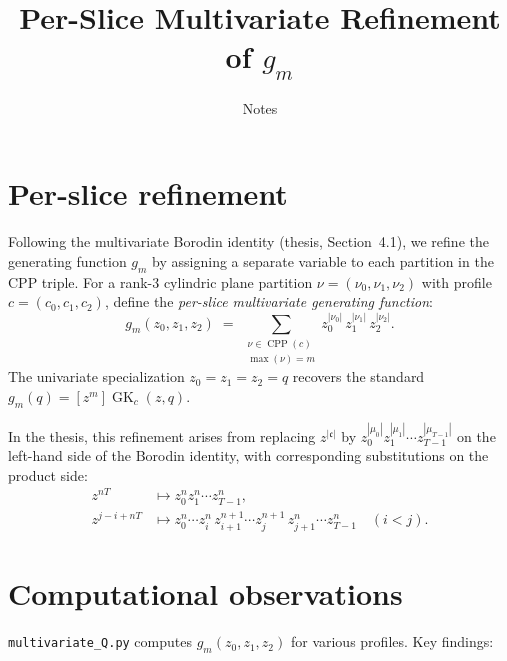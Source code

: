 \documentclass[11pt]{article}
\title{Per-Slice Multivariate Refinement of $g_m$}
\author{Notes}
\date{}
\newcommand{\CPP}{\operatorname{CPP}}
\newcommand{\GK}{\operatorname{GK}}
\begin{document}
\maketitle

\section{Per-slice refinement}

Following the multivariate Borodin identity (thesis, Section~4.1),
we refine the generating function $g_m$ by assigning a separate variable
to each partition in the CPP triple.  For a rank-3 cylindric plane
partition $\nu = (\nu_0, \nu_1, \nu_2)$ with profile $c = (c_0, c_1, c_2)$,
define the \emph{per-slice multivariate generating function}:
\[
  g_m(z_0, z_1, z_2)
  \;=\; \sum_{\substack{\nu \in \CPP(c) \\ \max(\nu) = m}}
    z_0^{|\nu_0|}\, z_1^{|\nu_1|}\, z_2^{|\nu_2|}.
\]
The univariate specialization $z_0 = z_1 = z_2 = q$ recovers the
standard $g_m(q) = [z^m]\GK_c(z,q)$.

In the thesis, this refinement arises from replacing
$z^{|\mathfrak{c}|}$ by $z_0^{|\mu_0|} z_1^{|\mu_1|} \cdots z_{T-1}^{|\mu_{T-1}|}$
on the left-hand side of the Borodin identity, with corresponding
substitutions on the product side:
\begin{align*}
  z^{nT} &\mapsto z_0^n z_1^n \cdots z_{T-1}^n, \\
  z^{j-i+nT} &\mapsto z_0^n \cdots z_i^n \, z_{i+1}^{n+1} \cdots z_j^{n+1} \, z_{j+1}^n \cdots z_{T-1}^n
  \quad (i < j).
\end{align*}

\section{Computational observations}

\texttt{multivariate\_Q.py} computes $g_m(z_0,z_1,z_2)$ for various
profiles.  Key findings:
\end{document}
